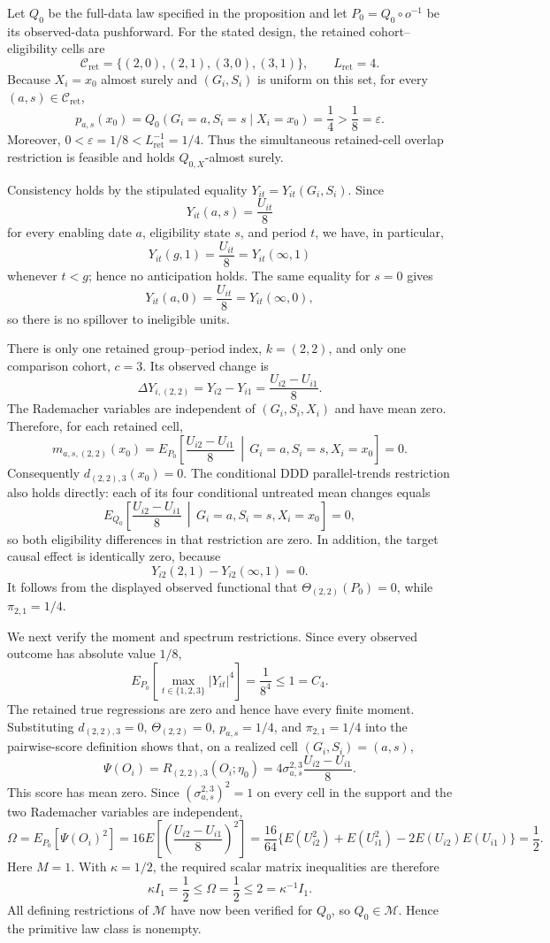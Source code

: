 Let \(Q_0\) be the full-data law specified in the proposition and let \(P_0=Q_0\circ o^{-1}\) be its observed-data pushforward.  For the stated design, the retained cohort--eligibility cells are
\[
\mathcal C_{\mathrm{ret}}=\{(2,0),(2,1),(3,0),(3,1)\},
\qquad L_{\mathrm{ret}}=4.
\]
Because \(X_i=x_0\) almost surely and \((G_i,S_i)\) is uniform on this set, for every \((a,s)\in\mathcal C_{\mathrm{ret}}\),
\[
p_{a,s}(x_0)=Q_0(G_i=a,S_i=s\mid X_i=x_0)=\frac14>\frac18=\varepsilon.
\]
Moreover, \(0<\varepsilon=1/8<L_{\mathrm{ret}}^{-1}=1/4\).  Thus the simultaneous retained-cell overlap restriction is feasible and holds \(Q_{0,X}\)-almost surely.

Consistency holds by the stipulated equality \(Y_{it}=Y_{it}(G_i,S_i)\).  Since
\[
Y_{it}(a,s)=\frac{U_{it}}8
\]
for every enabling date \(a\), eligibility state \(s\), and period \(t\), we have, in particular,
\[
Y_{it}(g,1)=\frac{U_{it}}8=Y_{it}(\infty,1)
\]
whenever \(t<g\); hence no anticipation holds.  The same equality for \(s=0\) gives
\[
Y_{it}(a,0)=\frac{U_{it}}8=Y_{it}(\infty,0),
\]
so there is no spillover to ineligible units.

There is only one retained group--period index, \(k=(2,2)\), and only one comparison cohort, \(c=3\).  Its observed change is
\[
\Delta Y_{i,(2,2)}=Y_{i2}-Y_{i1}=\frac{U_{i2}-U_{i1}}8.
\]
The Rademacher variables are independent of \((G_i,S_i,X_i)\) and have mean zero.  Therefore, for each retained cell,
\[
m_{a,s,(2,2)}(x_0)
=E_{P_0}\!\left[\frac{U_{i2}-U_{i1}}8\,\middle|\,G_i=a,S_i=s,X_i=x_0\right]
=0.
\]
Consequently \(d_{(2,2),3}(x_0)=0\).  The conditional DDD parallel-trends restriction also holds directly: each of its four conditional untreated mean changes equals
\[
E_{Q_0}\!\left[\frac{U_{i2}-U_{i1}}8\,\middle|\,G_i=a,S_i=s,X_i=x_0\right]=0,
\]
so both eligibility differences in that restriction are zero.  In addition, the target causal effect is identically zero, because
\[
Y_{i2}(2,1)-Y_{i2}(\infty,1)=0.
\]
It follows from the displayed observed functional that \(\Theta_{(2,2)}(P_0)=0\), while \(\pi_{2,1}=1/4\).

We next verify the moment and spectrum restrictions.  Since every observed outcome has absolute value \(1/8\),
\[
E_{P_0}\!\left[\max_{t\in\{1,2,3\}}|Y_{it}|^4\right]
=\frac1{8^4}
\le 1=C_4.
\]
The retained true regressions are zero and hence have every finite moment.  Substituting \(d_{(2,2),3}=0\), \(\Theta_{(2,2)}=0\), \(p_{a,s}=1/4\), and \(\pi_{2,1}=1/4\) into the pairwise-score definition shows that, on a realized cell \((G_i,S_i)=(a,s)\),
\[
\Psi(O_i)
=R_{(2,2),3}(O_i;\eta_0)
=4\sigma_{a,s}^{2,3}\frac{U_{i2}-U_{i1}}8.
\]
This score has mean zero.  Since \((\sigma_{a,s}^{2,3})^2=1\) on every cell in the support and the two Rademacher variables are independent,
\[
\Omega
=E_{P_0}[\Psi(O_i)^2]
=16E\!\left[\left(\frac{U_{i2}-U_{i1}}8\right)^2\right]
=\frac{16}{64}\{E(U_{i2}^2)+E(U_{i1}^2)-2E(U_{i2})E(U_{i1})\}
=\frac12.
\]
Here \(M=1\).  With \(\kappa=1/2\), the required scalar matrix inequalities are therefore
\[
\kappa I_1=\frac12\le\Omega=\frac12\le 2=\kappa^{-1}I_1.
\]
All defining restrictions of \(\mathcal M\) have now been verified for \(Q_0\), so \(Q_0\in\mathcal M\).  Hence the primitive law class is nonempty.